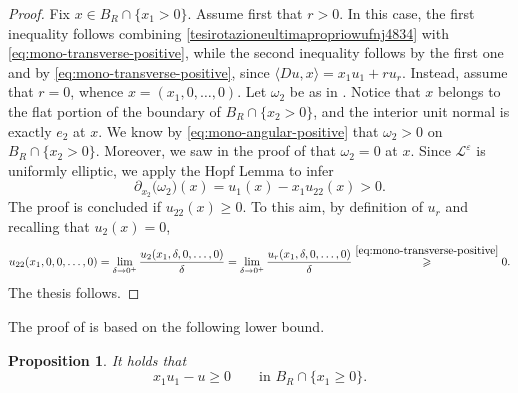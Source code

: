 \documentclass[11pt]{amsart}
\renewcommand{\geq}{\geqslant}
\renewcommand{\ge}{>}
\newcommand{\eps}{\varepsilon}
\newcommand{\Le}{\mathcal L^\eps}
\newtheorem{proposition}[theorem]{Proposition}
\theoremstyle{definition}
\theoremstyle{remark}
\numberwithin{equation}{section}
\begin{document}
\begin{proof}
Fix $x\in B_R\cap\{x_1\ge 0\}$. Assume first that $r\ge 0$. In this case, the first inequality follows combining \eqref{tesirotazioneultimapropriowufnj4834} with \eqref{eq:mono-transverse-positive}, while the second inequality follows by the first one and by \eqref{eq:mono-transverse-positive}, since $\langle Du,x\rangle =x_1 u_1+r u_r$. Instead, assume that $r=0$, whence $x=(x_1,0,\ldots,0)$. Let $\omega_2$ be as in .  Notice that $x$ belongs to the flat portion of the boundary of $B_R\cap \{x_2\ge 0\}$, and the interior unit normal is exactly $e_2$ at $x$. We know by \eqref{eq:mono-angular-positive} that $\omega_2\ge 0$ on $B_R\cap \{x_2\ge 0\}$. Moreover, we saw in the proof of  that $\omega_2=0$ at $x$. Since $\Le$ is uniformly elliptic, we apply the Hopf Lemma \cite[Lemma 3.4]{MR1814364} to infer
\begin{equation*}
    \partial _{x_2}\big(\omega_2\big)(x)=u_1(x)-x_1 u_{22}(x)\ge 0. 
\end{equation*}
The proof is concluded if $u_{22}(x)\geq 0$. To this aim, by definition of $u_r$ and recalling that $u_2(x)=0$,
\begin{equation*}
    u_{22}(x_1,0,0,\ldots,0)=\lim_{\delta\to 0^+}\frac{u_2(x_1,\delta,0,\ldots,0)}{\delta}=\lim_{\delta\to 0^+}\frac{u_r(x_1,\delta,0,\ldots,0)}{\delta}\overset{\eqref{eq:mono-transverse-positive}}{\geq}0.
\end{equation*}
The thesis follows.
\end{proof}
The proof of  is based on the following lower bound. 
\begin{proposition}\label{prop:mono-dilation}
It holds that 
\begin{equation}\label{eq:mono-dilation-conclusion}
 x_1u_1-u\geq0\qquad\text{in }B_R\cap\{x_1\geq0\}.
\end{equation}
\end{proposition}
\end{document}
